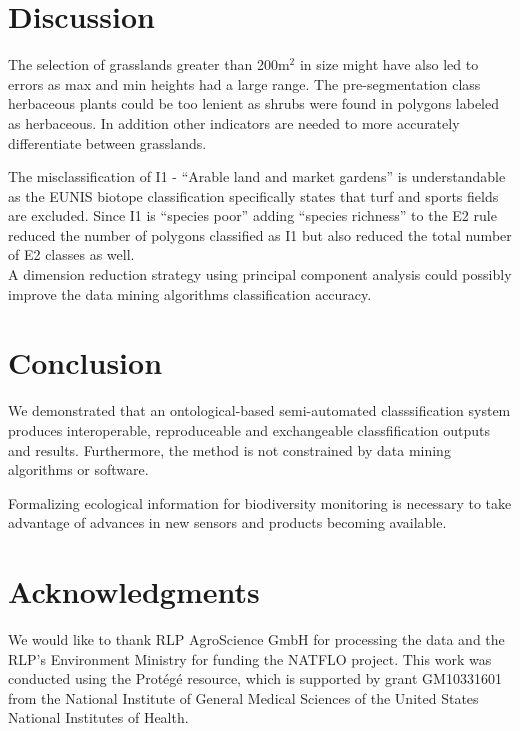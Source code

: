 \documentclass[authoryear, review,12pt,number]{elsarticle}
\begin{document}
\section{Discussion}

The selection of grasslands greater than 200m$^{2}$ in size might have also led
to errors as max and min heights had a large range. The pre-segmentation class
herbaceous plants could be too lenient as shrubs were found in polygons labeled
as herbaceous. In addition other indicators are needed to more accurately
differentiate between grasslands.

The misclassification of I1 - ``Arable land and market gardens'' is 
understandable as the EUNIS biotope classification specifically states that 
turf and sports fields are excluded. Since I1 is ``species poor'' adding 
``species richness'' to the E2 rule reduced the number of polygons classified 
as I1 but also reduced the total number of E2 classes as well.\\

A dimension reduction strategy using principal component analysis could possibly
improve the data mining algorithms classification accuracy.
\section{Conclusion}
We demonstrated that an ontological-based semi-automated classsification system
produces interoperable, reproduceable and exchangeable classfification outputs
and results. Furthermore, the method is not constrained by data mining
algorithms or software.  

Formalizing ecological information for biodiversity monitoring is
necessary to take advantage of advances in new sensors and products becoming
available. 
\section{Acknowledgments}
We would like to thank RLP AgroScience GmbH for processing the data and the 
RLP's Environment Ministry for funding the NATFLO project. This work was 
conducted using the Prot\'eg\'e resource, which is supported by grant 
GM10331601 from the National Institute of General Medical Sciences of the 
United States National Institutes of Health.
\end{document}
